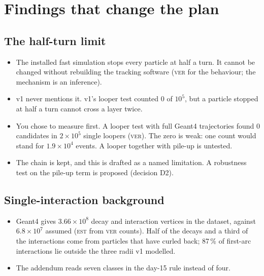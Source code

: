 \documentclass[11pt,a4paper]{article}
\newcommand{\est}{\textsc{est}}
\newcommand{\ver}{\textsc{ver}}
\begin{document}
\section{Findings that change the plan}
\subsection*{The half-turn limit}
\begin{itemize}
\item The installed fast simulation stops every particle at half a turn. It cannot be changed without rebuilding
      the tracking software (\ver{} for the behaviour; the mechanism is an inference).
\item v1 never mentions it. v1's looper test counted 0 of $10^{5}$, but a particle stopped at half a turn cannot
      cross a layer twice.
\item You chose to measure first. A looper test with full Geant4 trajectories found 0 candidates in
      $2\times10^{5}$ single loopers (\ver). The zero is weak: one count would stand for $1.9\times10^{4}$ events.
      A looper together with pile-up is untested.
\item The chain is kept, and this is drafted as a named limitation. A robustness test on the pile-up term is
      proposed (decision D2).
\end{itemize}
\subsection*{Single-interaction background}
\begin{itemize}
\item Geant4 gives $3.66\times10^{8}$ decay and interaction vertices in the dataset, against $6.8\times10^{7}$
      assumed (\est{} from \ver{} counts). Half of the decays and a third of the interactions come from particles
      that have curled back; 87\,\% of first-arc interactions lie outside the three radii v1 modelled.
\item The addendum reads seven classes in the day-15 rule instead of four.
\end{itemize}
\end{document}
